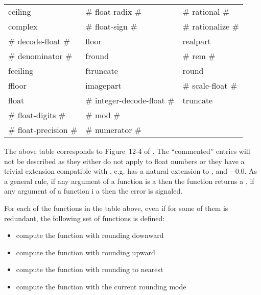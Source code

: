 \documentclass[../../Operations.tex]{subfiles}
\begin{document}
\label{sect:type-manipulation-ops}

\begin{tt}
  \begin{tabular}{lll}
    ceiling & \# float-radix \# & \# rational \#\\
    complex &  \# float-sign \# &  \# rationalize \#\\
    \# decode-float \# & floor  &  realpart\\
    \# denominator \# &  fround &  \# rem \#\\
    fceiling & ftruncate &  round\\
    ffloor &  imagepart & \# scale-float \#\\
    float & \# integer-decode-float \# & truncate\\
    \# float-digits \# & \# mod \# & \\
    \# float-precision \# & \# numerator \# & \\
  \end{tabular}
\end{tt}

\vspace*{3mm}

\noindent
The above table corresponds to Figure~12-4 of \cite{1996:ANSIHyperSpec}.
The ``commented'' entries will not be described as they either do not
apply to float numbers or they have a trivial extension
compatible with \cite{2012:LIA1,2001:LIA2,2004:LIA3}, e.g. 
has a natural extension to ,
 and $-0.0$. As a general rule, if any argument of a
function is a  then the function returns a
, if any argument of a function i a
 then the
 error is signaled.

\noindent
For each of the functions in the table above, even if for some of them is
redundant, the following set of functions is defined:
\begin{itemize}
\item {} compute the function with rounding downward
\item {} compute the function with rounding upward
\item {} compute the function with rounding to nearest
\item {} compute the function with the current rounding mode
\end{itemize}
\vspace*{3mm}





\end{document}
